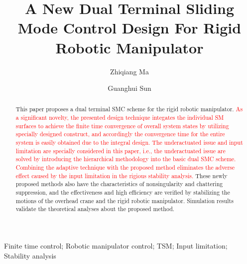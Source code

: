 \documentclass[3p]{elsarticle}
\theoremstyle{plain}
\theoremstyle{remark}
\begin{document}
\begin{frontmatter}
\title{A New Dual Terminal Sliding Mode Control Design For Rigid Robotic Manipulator}
\author{Zhiqiang Ma}
\author{Guanghui Sun}
\address{Research Institute of Intelligent Control and Systems, Harbin Institute of Technology, Harbin 150001, China}

\begin{abstract}
This paper proposes a dual terminal SMC scheme for the rigid robotic manipulator. \textcolor{red}{As a signiﬁcant novelty, the presented design technique integates the individual SM surfaces to achieve the finite time convergence of overall system states by utilizing specially designed construct, and accordingly the convergence time for the entire system is easily obtained due to the integral design. The underactuated issue and input limitation are specially considered in this paper, i.e., the underactuated issue are solved by introducing the hierarchical methodology into the basic dual SMC scheme. Combining the adaptive technique with the proposed method eliminates the adverse effect caused by the input limitation in the rigious stability analysis.} These newly proposed methods also have the characteristics of nonsingularity and chattering suppression, and the effectiveness and high efficiency are verified by stabilizing the motions of the overhead crane and the rigid robotic manipulator. Simulation results validate the theoretical analyses about the proposed method.
\end{abstract}
\begin{keyword}
Finite time control; Robotic manipulator control; TSM; Input limitation; Stability analysis
\end{keyword}
\end{frontmatter}
\end{document}
